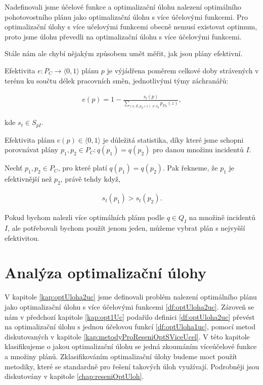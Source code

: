 Nadefinovali jsme účelové funkce a optimalizační úlohu nalezení optimálního pohotovostního plánu jako optimalizační úlohu s více účelovými funkcemi.
Pro optimalizační úlohy s více učelovými funkcemi obecně nemusí existovat optimum, proto jsme úlohu převedli na optimalizační úlohu s více účelovými funkcemi.

Stále nám ale chybí nějakým způsobem umět měřit, jak jsou plány efektivní.

\begin{definice}\label{df:efPlanu}
  Efektivita $e \colon P_C \rightarrow \langle 0, 1 \rangle$ plánu $p$ je výjádřena poměrem celkové doby strávených v terénu ku součtu délek pracovních směn, jednotlivými týmy záchranářů:

  \begin{align*}
    e(p) = 1 - \frac{s_t(p)}{\sum_{z \in Z, p_Z(z) \neq v_{\emptyset}} p_{D_2}(z)},
  \end{align*}

  kde $s_t \in S_{pI}$.
\end{definice}

Efektivita plánu $e(p) \in \langle 0, 1 \rangle$ je důležitá statistika, díky které jsme schopni porovnávat plány $p_1, p_2 \in P_C \colon q(p_1) = q(p_2)$ pro danou množinu incidentů $I$.

\begin{definice}\label{df:porPlanuEf}
  Nechť $p_1, p_2 \in P_C$, pro které platí $q(p_1) = q(p_2)$.
  Pak řekneme, že $p_1$ je efektivnější než $p_2$, právě tehdy když,

  \begin{align*}
    s_t(p_1) > s_t(p_2).
  \end{align*}
\end{definice}

Pokud bychom nalezli více optimálních plánu podle $q \in Q_I$ na množině incidentů $I$, ale potřebovali bychom použít jenom jeden, můžeme vybrat plán s nejvyšší efektivitou. 

\section{Analýza optimalizační úlohy}

V kapitole \ref{kap:optUloha2uc} jsme definovali problém nalezení optimálního plánu jako optimalizační úlohu s více účelovými funkcemi \ref{df:optUloha2uc}.
Zároveň se nám v předchozí kapitole \ref{kap:opt1Uc} podařilo definici \ref{df:optUloha2uc} převést na optimalizační úlohu s jednou účelovou funkcí \ref{df:optUloha1uc},
pomocí metod diskutovaných v kapitole \ref{kap:metodyProReseniOptSViceUcel}.
V této kapitole klasifikujeme o jakou optimalizační úlohu se jedná zkoumáním víceúčelové funkce a množiny plánů.
Zklasifikováním optimalizační úlohy budeme moct použít metodiky, které se standardně pro řešení takových úloh využívají. 
Podrobněji jsou diskutovány v kapitole \ref{chap:reseniOptUloh}.

